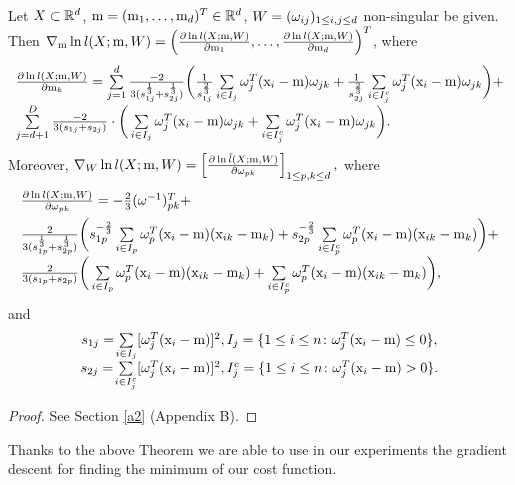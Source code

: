 \begin{theorem}\label{ther:grad}
Let $X \subset \mathbb{R}^d$, $\mathrm{m} = (\mathrm{m}_1, \ldots, \mathrm{m}_d)^T \in \mathbb{R}^d$, $W = (\omega_{ij})_{1 \leq i,j \leq d}$ non-singular be given. 
Then
$\nabla_{\mathrm{m}}  \ln {l}(X;\mathrm{m},W) = \left(  \frac{\partial \ln {l}(X;\mathrm{m},W)}{\partial \mathrm{m}_1}, \ldots, \frac{\partial \ln {l}(X;\mathrm{m},W)}{\partial \mathrm{m}_d} \right)^T$,
where
$$
\begin{array}{l}
\frac{\partial \ln {l(X;\m,W)}}{\partial \m_k} =\sum\limits_{j=1}^d \frac{-2}{3({s}_{1j}^{\frac{1}{3}} + {s}_{2j}^{\frac{1}{3}})} \bigg(
\frac{1}{{s}_{1j}^{\frac{2}{3}}} \sum\limits_{i \in I_j} \w_j^T (\x_i - \m)  \w_{jk} +%
\frac{1}{{s}_{2j}^{\frac{2}{3}}} \sum\limits_{i \in I_j^c} \w_j^T (\x_i - \m) \w_{jk}
\bigg)+ \\[6pt]
\sum\limits_{j=d+1}^D \frac{-2}{3(s_{1j}+s_{2j})} \cdot %
\bigg(
 \sum\limits_{i \in I_j} \w_j^T (\x_i - \m)  \w_{jk} + %
 \sum\limits_{i \in I_j^c} \w_j^T (\x_i - \m) \w_{jk}
\bigg).
\end{array}
$$
Moreover,
$
\nabla_{W} \ln {l}(X;\mathrm{m},W) = \left[ \frac{\partial \ln \tilde{l}(X;\mathrm{m},W)}{\partial \omega_{pk}}  \right]_{1 \leq p,k \leq d},
$
where
$$
\begin{array}{l}
\frac{\partial \ln {l(X;\mathrm{m},W)}}{\partial \omega_{pk}} = -\frac{2}{3} (\omega^{-1})^T_{pk} +\\[6pt]
 \frac{2}{3({s}_{1p}^{\frac{1}{3}} +{s}_{2p}^{\frac{1}{3}})} 
 \bigg(
{s}_{1p}^{-\frac{2}{3}} \sum\limits_{ i \in {I}_p} \omega^T_p (\mathrm{x}_i - \mathrm{m}) (\mathrm{x}_{ik} - \mathrm{m}_k)
+ {s}_{2p}^{-\frac{2}{3}} \sum\limits_{ i \in {I}_p^c} \omega^T_p (\mathrm{x}_i - \mathrm{m}) (\mathrm{x}_{ik} - \mathrm{m}_k) \bigg)+ \\[6pt]
\frac{2}{ 3(s_{1p}+s_{2p}) } \bigg( 
\sum\limits_{ i \in {I}_p} \omega^T_p (\mathrm{x}_i - \mathrm{m}) (\mathrm{x}_{ik} - \mathrm{m}_k) + \sum\limits_{ i \in {I}_p^c} \omega^T_p (\mathrm{x}_i - \mathrm{m}) (\mathrm{x}_{ik} - \mathrm{m}_k) \bigg),
\end{array}
$$
and
$$
\begin{array}{c}
{s}_{1j}= \! \sum\limits_{i \in I_j}[ \omega_{j}^T (\mathrm{x}_i-\mathrm{m})]^2, {I}_j=\{ 1 \leq i \leq n \colon \omega_{j}^T (\mathrm{x}_i-\mathrm{m}) \leq 0 \},
\\[1ex]
{s}_{2j}= \! \sum\limits_{i \in I_j^c}[ \omega_{j}^T (\mathrm{x}_i-\mathrm{m})]^2,  {I}_j^c=\{ 1 \leq i \leq n \colon  \omega_{j}^T (\mathrm{x}_i-\mathrm{m}) > 0 \}.
\end{array}
$$
\end{theorem}

\begin{proof}
See Section \ref{a2} (Appendix B).
\end{proof}


Thanks to the above Theorem we are able to use in our experiments the gradient descent for finding the minimum of our cost function.


